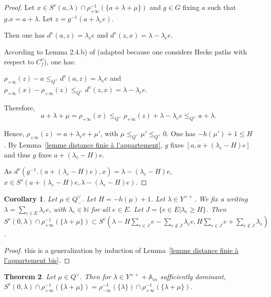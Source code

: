 \documentclass[12pt]{article}
\theoremstyle{plain}
\newtheorem{theorem}{Theorem}[section] %
\newtheorem{corollary}[theorem]{Corollary}
\theoremstyle{definition}
\newcommand{\A}{\mathbb{A}}
\newcommand{\N}{\mathbb{N}}
\begin{document}
\begin{proof} Let $x\in S^v(a,\lambda)\cap\rho_{+\infty}^{-1}(\{a+\lambda+\mu\})$ and $g\in G$ fixing $a$ such that $g.x=a+\lambda$.  Let $z=g^{-1}(a+\lambda_e e)$.

Then one has $d^v(a,z)=\lambda_e e$ and $d^v(z,x)=\lambda-\lambda_e e$.

According to Lemma 2.4.b) of \cite{gaussent2014spherical} (adapted because one considers Hecke paths with respect to $C^v_f$), one has: 

$\rho_{+\infty}(z)-a\leq_{Q^\vee} d^v(a,z)=\lambda_e e$ and $\rho_{+\infty}(x)-\rho_{+\infty}(z)\leq_{Q^\vee} d^v(z,x)=\lambda-\lambda_e e$.

Therefore, \[a+\lambda+\mu=\rho_{+\infty}(x)\leq_{Q^\vee} \rho_{+\infty}(z)+\lambda-\lambda_e e\leq_{Q^\vee}a+\lambda.\]

Hence, $\rho_{+\infty}(z)=a+\lambda_e e+\mu'$, with $\mu\leq_{Q^\vee}\mu'\leq_{Q^\vee}0$. One has $-h(\mu')+1\leq H$. By Lemma~\ref{lemme distance finie à l'appartement}, $g$ fixes $[a,a+(\lambda_e-H)e]$ and thus $g$ fixes $a+(\lambda_e-H)e$. 

As $d^v(g^{-1}.(a+(\lambda_e-H)e),x)=\lambda-(\lambda_e-H)e$, $x\in S^v(a+(\lambda_e -H)e,\lambda-(\lambda_e-H)e)$.  
 \end{proof}
 
 
\begin{corollary}\label{lemme majoration du cardinal des boules}
 Let $\mu \in Q^\vee_-$. Let $H=-h(\mu)+1$. Let $\lambda\in Y^{++}$. We fix a writing  $\lambda=\sum_{e\in E}\lambda_e e$, with $\lambda_e\in \N$ for all $e\in E$. Let $J=\{e\in E | \lambda_e \geq H\}$. Then $S^v(0,\lambda)\cap \rho_{+\infty}^{-1}(\{\lambda+\mu\})\subset S^v(\lambda-H\sum_{e\in J} e-\sum_{e\notin J}\lambda_e e, H\sum_{e\in J}e+\sum_{e\notin J}\lambda_ e)$. 
\end{corollary}
 
\begin{proof} this is a generalization by induction of Lemma~\ref{lemme distance finie à l'appartement bis}.
\end{proof}

    
 \begin{theorem}\label{thm égalité des ensembles bis}
 Let $\mu\in Q^\vee$. Then for $\lambda\in Y^{++}+\A_{in}$ sufficiently dominant, $S^v(0,\lambda)\cap \rho_{+\infty}^{-1}(\{\lambda+\mu\})=\rho_{-\infty}^{-1}(\{\lambda\})\cap\rho_{+\infty}^{-1}(\{\lambda+\mu\})$.
 \end{theorem}
 
\end{document}
